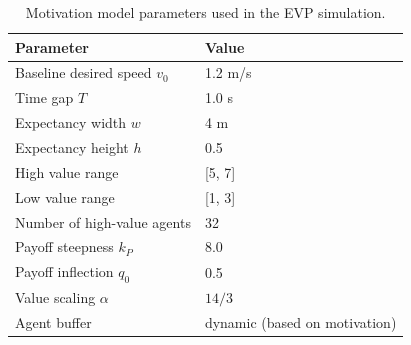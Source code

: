 \documentclass[pdflatex,sn-mathphys-num]{sn-jnl}%
\theoremstyle{thmstyleone}%
\theoremstyle{thmstyletwo}%
\theoremstyle{thmstylethree}%
\begin{document}
\begin{table}[htbp]
  \centering
  \caption{Motivation model parameters used in the EVP simulation.}
  \begin{tabular}{ll}
    \toprule
    Parameter & Value \\
    \midrule
    Baseline desired speed $v_0$ & 1.2 m/s \\
    Time gap $T$ & 1.0 s \\
    Expectancy width $w$ & 4 m\\
    Expectancy height $h$ & 0.5 \\
    High value range & [5, 7] \\
    Low value range & [1, 3] \\
    Number of high-value agents & 32 \\
    Payoff steepness $k_P$ & 8.0 \\
    Payoff inflection $q_0$ & 0.5 \\
    Value scaling $\alpha$ & $14/3$ \\
    Agent buffer & dynamic (based on motivation) \\
    \bottomrule
  \end{tabular}
  \label{tab:evc_parameters}
\end{table}
\end{document}
